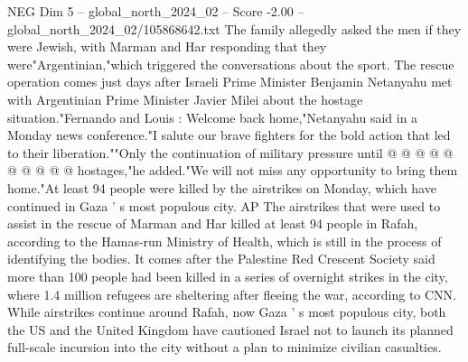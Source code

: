 \begin{textsample}{NEG Dim 5 – global\_north\_2024\_02 – Score -2.00 – global\_north\_2024\_02/105868642.txt}
The family allegedly asked the men if they were Jewish, with Marman and Har responding that they were"Argentinian,"which triggered the conversations about the sport.
The rescue operation comes just days after Israeli Prime Minister Benjamin Netanyahu met with Argentinian Prime Minister Javier Milei about the hostage situation."Fernando and Louis : Welcome back home,"Netanyahu said in a Monday news conference."I salute our brave fighters for the bold action that led to their liberation.""Only the continuation of military pressure until @ @ @ @ @ @ @ @ @ @ hostages,"he added."We will not miss any opportunity to bring them home."At least 94 people were killed by the airstrikes on Monday, which have continued in Gaza ' s most populous city.
AP The airstrikes that were used to assist in the rescue of Marman and Har killed at least 94 people in Rafah, according to the Hamas-run Ministry of Health, which is still in the process of identifying the bodies.
It comes after the Palestine Red Crescent Society said more than 100 people had been killed in a series of overnight strikes in the city, where 1.4 million refugees are sheltering after fleeing the war, according to CNN.
While airstrikes continue around Rafah, now Gaza ' s most populous city, both the US and the United Kingdom have cautioned Israel not to launch its planned full-scale incursion into the city without a plan to minimize civilian casualties.

\end{textsample}
